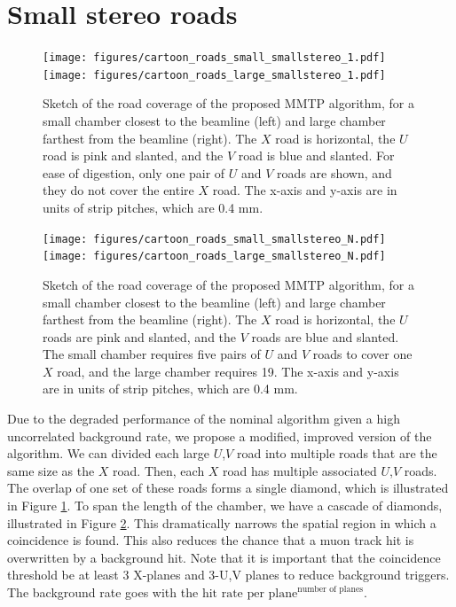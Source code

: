 \section{Small stereo roads}
\label{sec:stereoroads}
\begin{figure}[!htpb]
  \begin{center}
    \texttt{[image: figures/cartoon\_roads\_small\_smallstereo\_1.pdf]}
    \texttt{[image: figures/cartoon\_roads\_large\_smallstereo\_1.pdf]}
  \end{center}
  \vspace{-10pt}
  \caption{Sketch of the road coverage of the proposed MMTP algorithm, for a small chamber closest to the beamline (left) and large chamber farthest from the beamline (right). The $X$ road is horizontal, the $U$ road is pink and slanted, and the $V$ road is blue and slanted. For ease of digestion, only one pair of $U$ and $V$ roads are shown, and they do not cover the entire $X$ road. The x-axis and y-axis are in units of strip pitches, which are 0.4 mm.}
  \label{fig:cartoon_smallroads_1}
\end{figure}
\begin{figure}[!htpb]
  \begin{center}
    \texttt{[image: figures/cartoon\_roads\_small\_smallstereo\_N.pdf]}
    \texttt{[image: figures/cartoon\_roads\_large\_smallstereo\_N.pdf]}
  \end{center}
  \vspace{-10pt}
  \caption{Sketch of the road coverage of the proposed MMTP algorithm, for a small chamber closest to the beamline (left) and large chamber farthest from the beamline (right). The $X$ road is horizontal, the $U$ roads are pink and slanted, and the $V$ roads are blue and slanted. The small chamber requires five pairs of $U$ and $V$ roads to cover one $X$ road, and the large chamber requires 19. The x-axis and y-axis are in units of strip pitches, which are 0.4 mm.}
  \label{fig:cartoon_smallroads_N}
\end{figure}
Due to the degraded performance of the nominal algorithm given a high uncorrelated background rate, we propose a modified, improved version of the algorithm.
We can divided each large $U$,$V$ road into multiple roads that are the same size as the $X$ road. Then, each $X$ road has multiple associated $U$,$V$ roads. The overlap of one set of these roads forms a single diamond, which is illustrated in Figure \ref{fig:cartoon_smallroads_1}. To span the length of the chamber, we have a cascade of diamonds, illustrated in Figure \ref{fig:cartoon_smallroads_N}. This dramatically narrows the spatial region in which a coincidence is found. This also reduces the chance that a muon track hit is overwritten by a background hit. Note that it is important that the coincidence threshold be at least 3 X-planes and 3-U,V planes to reduce background triggers. The background rate goes with the $\text{hit rate per plane}^{\text{number of planes}}$.  
